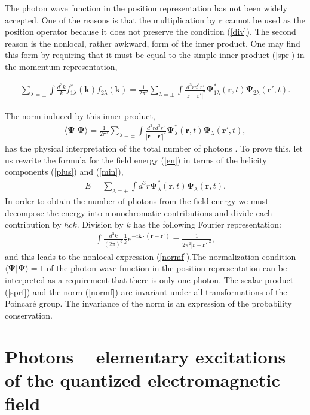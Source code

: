 \documentclass[onecolumn,aps,pra,12pt]{revtex4-1}
\begin{document}
The photon wave function in the position representation has not been widely accepted. One of the reasons is that the multiplication by $\bm r$ cannot be used as the position operator because it does not preserve the condition (\ref{div}). The second reason is the nonlocal, rather awkward, form of the inner product. One may find this form by requiring that it must be equal to the simple inner product (\ref{spr}) in the momentum representation,
\begin{widetext}
\begin{align}\label{sprf}
\sum_{\lambda=\pm}\int\!\frac{d^3k}{k}f_{1\lambda}^*({\bm k})f_{2\lambda}({\bm k})=\frac{1}{2\pi^2}\sum_{\lambda=\pm}\int\!\frac{d^3rd^3r'}{|\bm r-\bm r'|^2}{\bm \Psi}^*_{1\lambda}(\bm r,t){\bm \Psi}_{2\lambda}(\bm r',t).
\end{align}
\end{widetext}
The norm induced by this inner product,
\begin{align}\label{normf}
\langle{\bm \Psi}|{\bm \Psi}\rangle=\frac{1}{2\pi^2}\sum_{\lambda
=\pm}\int\!\frac{d^3rd^3r'}{|\bm r-\bm r'|^2}{\bm \Psi}^*_{\lambda}(\bm r,t){\bm \Psi}_{\lambda}(\bm r',t),
\end{align}
has the physical interpretation of the total number of photons \cite{zeld}. To prove this, let us rewrite the formula for the field energy (\ref{en}) in terms of the helicity components (\ref{plus}) and (\ref{min}),
\begin{align}\label{enpsi}
E=\sum_{\lambda=\pm}\int\!d^3r{\bm \Psi}^*_{\lambda}(\bm r,t){\bm \Psi}_{\lambda}(\bm r,t).
\end{align}
In order to obtain the number of photons from the field energy we must decompose the energy into monochromatic contributions and divide each contribution by $\hbar ck$. Division by $k$ has the following Fourier representation:
\begin{align}
\int \frac{d^3k}{(2\pi)^3}\frac{1}{k}e^{-i{\bm k}\cdot({\bm r}-{\bm r'})} = \frac{1}{2\pi^2|\bm r-\bm r'|^2},
\end{align}
and this leads to the nonlocal expression (\ref{normf}).The normalization condition $\langle{\bm \Psi}|{\bm \Psi}\rangle=1$ of the photon wave function in the position representation can be interpreted as a requirement that there is only one photon. The scalar product (\ref{sprf}) and the norm (\ref{normf}) are invariant under all transformations of the Poincar\'e group. The invariance of the norm is an expression of the probability conservation.

\section{Photons -- elementary excitations of the quantized electromagnetic field}
\end{document}
